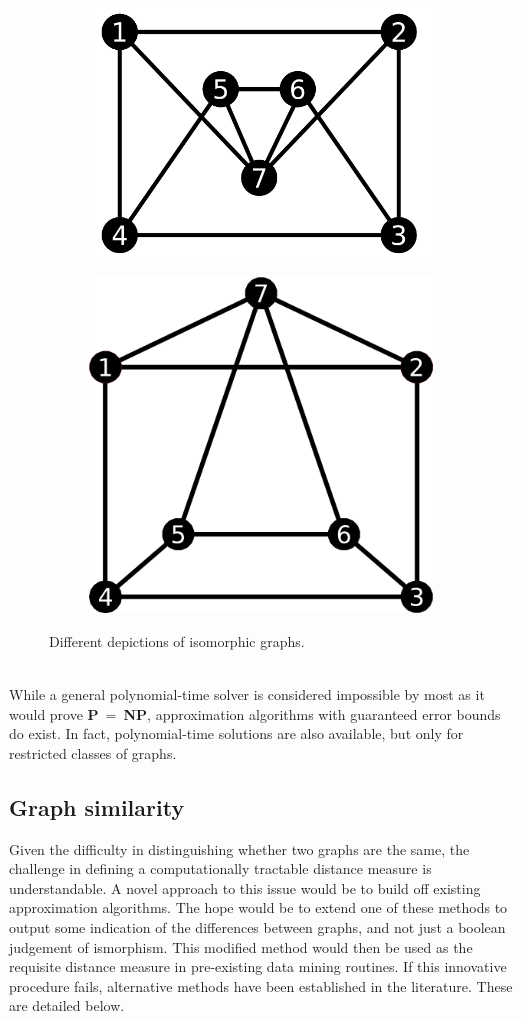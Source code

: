 \documentclass[11pt]{article}
\begin{document}
\begin{figure}[h!]
  \centering
  \begin{subfigure}{.5\textwidth}
    \centering
    \includegraphics[width=.65\linewidth]{graphA}
    \caption{}
    \label{fig:graphA}
  \end{subfigure}%
  \begin{subfigure}{.5\textwidth}
    \centering
    \includegraphics[width=.65\linewidth]{graphB}
    \caption{}
    \label{fig:graphB}
  \end{subfigure}%
  \caption{Different depictions of isomorphic graphs.}
  \label{fig:isoGraphs}
\end{figure}
\vspace{1mm}\\
While a general polynomial-time solver is considered impossible by most as it would prove \textbf{P}$ \ = \ $\textbf{NP}, approximation algorithms with guaranteed error bounds do exist. In fact, polynomial-time solutions are also available, but only for restricted classes of graphs.
\subsection{Graph similarity}
\label{subsec:GS}
\indent Given the difficulty in distinguishing whether two graphs are the same, the challenge in defining a computationally tractable distance measure is understandable. A novel approach to this issue would be to build off existing approximation algorithms. The hope would be to extend one of these methods to output some indication of the differences between graphs, and not just a boolean judgement of ismorphism. This modified method would then be used as the requisite distance measure in pre-existing data mining routines. If this innovative procedure fails, alternative methods have been established in the literature. These are detailed below.
\end{document}
